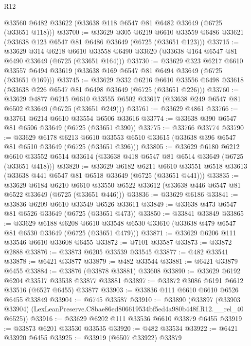 \begin{lexlean}{R12}
\begin{coremodule}
    @33560
    @6482
    @33622
    (@33638 @118 @6547 @81 @6482 @33649 (@6725 (@33651 @118)))
@33700 := @33629
    @305
    @6219
    @6610
    @33559
    @6486
    @33621
    (@33638 @123 @6547 @81 @6486 @33649 (@6725 (@33651 @123)))
@33715 := @33629
    @314
    @6218
    @6610
    @33558
    @6490
    @33620
    (@33638 @164 @6547 @81 @6490 @33649 (@6725 (@33651 @164)))
@33730 := @33629
    @323
    @6217
    @6610
    @33557
    @6494
    @33619
    (@33638 @169 @6547 @81 @6494 @33649 (@6725 (@33651 @169)))
@33745 := @33629
    @332
    @6216
    @6610
    @33556
    @6498
    @33618
    (@33638 @226 @6547 @81 @6498 @33649 (@6725 (@33651 @226)))
@33760 := @33629
    @4877
    @6215
    @6610
    @33555
    @6502
    @33617
    (@33638 @249 @6547 @81 @6502 @33649 (@6725 (@33651 @249)))
@33761 := @33629 @4861
@33766 := @33761 @6214 @6610 @33554 @6506 @33616
@33774 := @33638 @390 @6547 @81 @6506 @33649 (@6725 (@33651 @390))
@33775 := @33766 @33774
@33790 := @33629
    @6178
    @6213
    @6610
    @33553
    @6510
    @33615
    (@33638 @396 @6547 @81 @6510 @33649 (@6725 (@33651 @396)))
@33805 := @33629
    @6180
    @6212
    @6610
    @33552
    @6514
    @33614
    (@33638 @418 @6547 @81 @6514 @33649 (@6725 (@33651 @418)))
@33820 := @33629
    @6182
    @6211
    @6610
    @33551
    @6518
    @33613
    (@33638 @441 @6547 @81 @6518 @33649 (@6725 (@33651 @441)))
@33835 := @33629
    @6184
    @6210
    @6610
    @33550
    @6522
    @33612
    (@33638 @446 @6547 @81 @6522 @33649 (@6725 (@33651 @446)))
@33836 := @33629 @6186
@33841 := @33836 @6209 @6610 @33549 @6526 @33611
@33849 := @33638 @473 @6547 @81 @6526 @33649 (@6725 (@33651 @473))
@33850 := @33841 @33849
@33865 := @33629
    @6188
    @6208
    @6610
    @33548
    @6530
    @33610
    (@33638 @479 @6547 @81 @6530 @33649 (@6725 (@33651 @479)))
@33871 := @33629 @6206 @111 @33546 @6610 @33608 @6455
@33872 := @7101 @33587
@33873 := @33872 @2888
@33876 := @33873 @6205 @33539 @33545
@33877 := @482 @33541
@33878 := @6421 @33877
@33879 := @482 @33544
@33881 := @6421 @33879 @6455
@33884 := @33876 (@33878 @33881) @33608
@33890 := @33629 @6192 @6204 @33517 @33538 @33877 @33881
@33897 := @33872 @3086 @6191 @6612 @33516 (@6527 @6455) @33877
@33903 := @33836 @111 @6610 @6610 @6526 @6455 @33849
@33904 := @6745 @33587
@33910 := @33890
    (@33897 (@33903 @33904) (LexLeanPreserve.C8bae86ed806619534bf5ed4a980b448f.R12.__rel_40 @6525))
@33916 := @33629 @6202 @111 @33536 @6610 @33879 @6455
@33919 := @33873 @6201 @33530 @33535
@33920 := @482 @33534
@33922 := @6421 @33920 @6455
@33925 := @33919 (@6507 @33922) @33879

\end{coremodule}
\end{lexlean}
